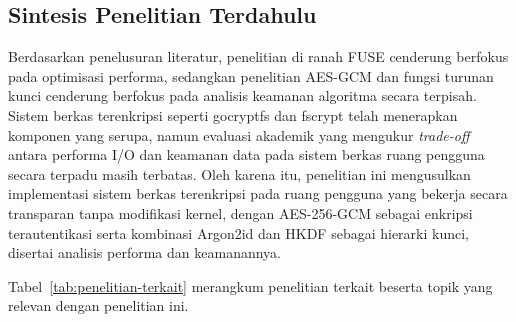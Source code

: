 \subsection{Sintesis Penelitian Terdahulu}
Berdasarkan penelusuran literatur, penelitian di ranah FUSE cenderung berfokus pada optimisasi performa, sedangkan penelitian AES-GCM dan fungsi turunan kunci cenderung berfokus pada analisis keamanan algoritma secara terpisah. Sistem berkas terenkripsi seperti gocryptfs dan fscrypt telah menerapkan komponen yang serupa, namun evaluasi akademik yang mengukur \textit{trade-off} antara performa I/O dan keamanan data pada sistem berkas ruang pengguna secara terpadu masih terbatas. Oleh karena itu, penelitian ini mengusulkan implementasi sistem berkas terenkripsi pada ruang pengguna yang bekerja secara transparan tanpa modifikasi kernel, dengan AES-256-GCM sebagai enkripsi terautentikasi serta kombinasi Argon2id dan HKDF sebagai hierarki kunci, disertai analisis performa dan keamanannya.
 

Tabel~\ref{tab:penelitian-terkait} merangkum penelitian terkait beserta topik yang relevan dengan penelitian ini.

